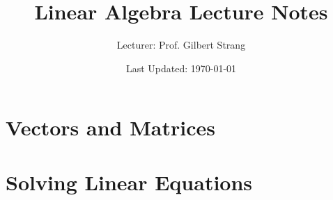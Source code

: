 \documentclass[a4paper, oneside, 12pt]{book}
\title{Linear Algebra Lecture Notes}
\author{Lecturer: Prof. Gilbert Strang}
\date{Last Updated: \today}
\begin{document}
\maketitle
\tableofcontents

\chapter{Vectors and Matrices}


\clearpage

\chapter{Solving Linear Equations}

\end{document}
